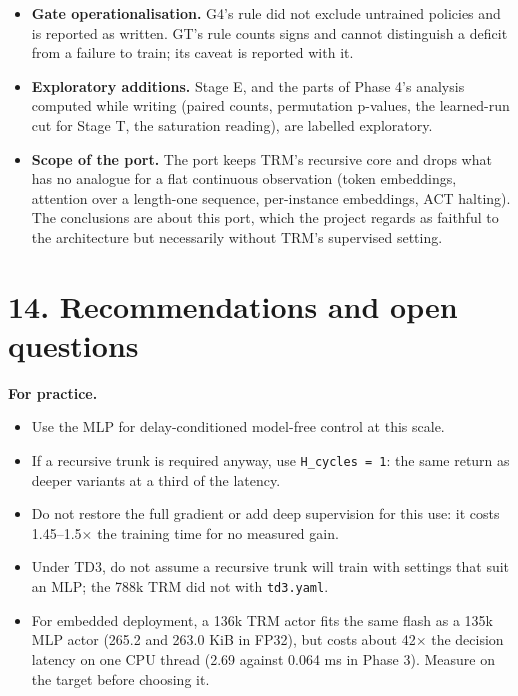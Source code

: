 \documentclass[11pt]{article}
\begin{document}
\begin{itemize}
\item \textbf{Gate operationalisation.} G4's rule did not exclude untrained policies and is reported as written. GT's rule counts signs and cannot distinguish a deficit from a failure to train; its caveat is reported with it.
\item \textbf{Exploratory additions.} Stage E, and the parts of Phase 4's analysis computed while writing (paired counts, permutation p-values, the learned-run cut for Stage T, the saturation reading), are labelled exploratory.
\item \textbf{Scope of the port.} The port keeps TRM's recursive core and drops what has no analogue for a flat continuous observation (token embeddings, attention over a length-one sequence, per-instance embeddings, ACT halting). The conclusions are about this port, which the project regards as faithful to the architecture but necessarily without TRM's supervised setting.
\end{itemize}



\medskip



\section*{14. Recommendations and open questions}



\textbf{For practice.}

\begin{itemize}
\item Use the MLP for delay-conditioned model-free control at this scale.
\item If a recursive trunk is required anyway, use \texttt{H\_cycles = 1}: the same return as deeper variants at a third of the latency.
\item Do not restore the full gradient or add deep supervision for this use: it costs 1.45--1.5$\times$ the training time for no measured gain.
\item Under TD3, do not assume a recursive trunk will train with settings that suit an MLP; the 788k TRM did not with \texttt{td3.yaml}.
\item For embedded deployment, a 136k TRM actor fits the same flash as a 135k MLP actor (265.2 and 263.0 KiB in FP32), but costs about 42$\times$ the decision latency on one CPU thread (2.69 against 0.064 ms in Phase 3). Measure on the target before choosing it.
\end{itemize}
\end{document}
